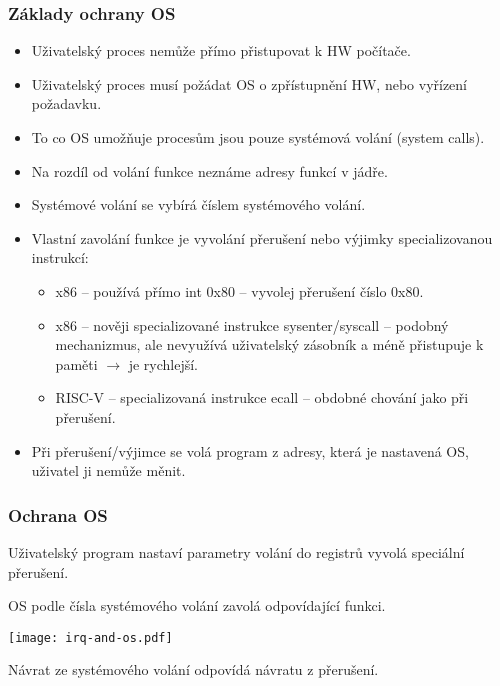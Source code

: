\documentclass{beamer}
\begin{document}
\begin{frame}
\frametitle{Základy ochrany OS}

\begin{itemize}
\item Uživatelský proces nemůže přímo přistupovat k HW počítače.
\item Uživatelský proces musí požádat OS o zpřístupnění HW, nebo vyřízení požadavku.
\item To co OS umožňuje procesům jsou pouze systémová volání (system calls).
\item Na rozdíl od volání funkce neznáme adresy funkcí v jádře.
\item Systémové volání se vybírá číslem systémového volání.
\item Vlastní zavolání funkce je vyvolání přerušení nebo výjimky specializovanou instrukcí:
\begin{itemize}
\item x86 -- používá přímo int 0x80 -- vyvolej přerušení číslo 0x80.
\item x86 -- nověji specializované instrukce sysenter/syscall -- podobný mechanizmus, ale nevyužívá uživatelský zásobník a méně přistupuje k paměti $\rightarrow$ je rychlejší.
\item RISC-V -- specializovaná instrukce ecall -- obdobné chování jako při přerušení.
\end{itemize}
\item Při přerušení/výjimce se volá program z adresy, která je nastavená OS, uživatel ji nemůže měnit.
\end{itemize}
\end{frame}

\begin{frame}
\frametitle{Ochrana OS}

Uživatelský program nastaví parametry volání do registrů vyvolá speciální přerušení.

OS podle čísla systémového volání zavolá odpovídající funkci.

\begin{center}
  \texttt{[image: irq-and-os.pdf]}
\end{center}

Návrat ze systémového volání odpovídá návratu z přerušení.
\end{frame}
\end{document}
